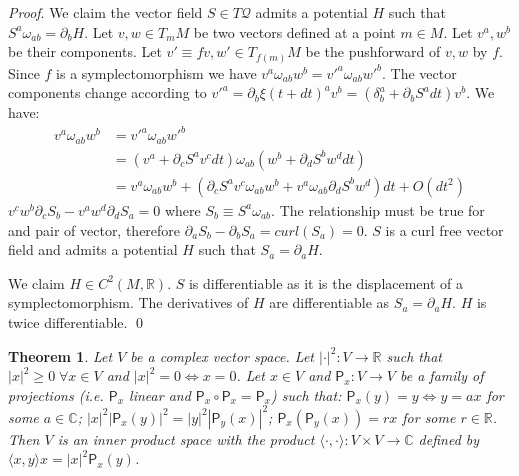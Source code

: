 \documentclass[smallextended]{svjour3}
\numberwithin{equation}{section}
\renewenvironment{proof}{\emph{Proof}.}{\hfill\(\qed\)}
\newtheorem{thrm}[equation]{Theorem}
\theoremstyle{definition}
\renewenvironment{proof}{\emph{Proof}.}{\qed}
\begin{document}
\begin{proof}
	We claim the vector field $S \in T\mathcal{Q}$ admits a potential $H$ such that $S^{a} \omega_{ab} = \partial_{b}H$. Let $v, w \in T_m M$ be two vectors defined at a point $m \in M$. Let $v^a, w^b$ be their components. Let $v'\equiv f v, w' \in T_{f(m)}M$ be the pushforward of $v, w$ by $f$. Since $f$ is a symplectomorphism we have $v^{a} \omega_{ab} w^{b} = v'^{a} \omega_{ab} w'^{b}$. The vector components change according to $v'^a = \partial_b \xi(t+dt)^a v^b = (\delta^a_b + \partial_b S^a dt) v^b$. We have:
	\begin{align*}
	v^{a} \omega_{ab} w^{b} &= v'^{a} \omega_{ab} w'^{b}  \\
	&= (v^{a} + \partial_{c} S^{a} v^{c} dt) \omega_{ab} ( w^{b} + \partial_{d} S^{b} w^{d} dt) \\
	&= v^{a} \omega_{ab} w^{b} + (\partial_{c} S^{a} v^{c} \omega_{ab} w^{b} + v^{a} \omega_{ab} \partial_{d} S^{b} w^{d}) dt + O(dt^2)
	\end{align*}
	$v^{c} w^{b} \partial_{c} S_{b} - v^{a} w^{d} \partial_{d} S_{a} = 0$ where $S_{b} \equiv S^{a} \omega_{ab}$. The relationship must be true for and pair of vector, therefore $\partial_{a} S_{b} - \partial_{b} S_{a} = curl(S_{a}) = 0$. $S$ is a curl free vector field and admits a potential $H$ such that $S_{a} = \partial_{a}H$.
	
	We claim $H \in C^2(M, \mathbb{R})$. $S$ is differentiable as it is the displacement of a symplectomorphism. The derivatives of $H$ are differentiable as $S_{a} = \partial_{a}H$. $H$ is twice differentiable.
\end{proof}

\begin{thrm}\label{thrm:inner_product}
	Let $V$ be a complex vector space. Let $| \cdot | ^2 : V \rightarrow \mathbb{R}$ such that $|x|^2 \ge 0 \; \forall x \in V$ and $|x|^2 = 0 \Leftrightarrow x = 0$. Let $x \in V$ and $\mathsf{P}_x : V \rightarrow V$ be a family of projections (i.e. $\mathsf{P}_x$ linear and $\mathsf{P}_x \circ \mathsf{P}_x = \mathsf{P}_x$) such that: $\mathsf{P}_x (y) = y \Leftrightarrow y = a x$ for some $a \in \mathbb{C}$; $|x|^2|\mathsf{P}_x (y)|^2=|y|^2|\mathsf{P}_y (x)|^2$; $\mathsf{P}_x (\mathsf{P}_y (x)) = r x$ for some $r \in \mathbb{R}$.
	Then $V$ is an inner product space with the product $\langle \cdot , \cdot \rangle : V \times V \rightarrow \mathbb{C}$ defined by $\langle x , y \rangle x = |x|^2 \mathsf{P}_x (y)$.
\end{thrm}
\end{document}
